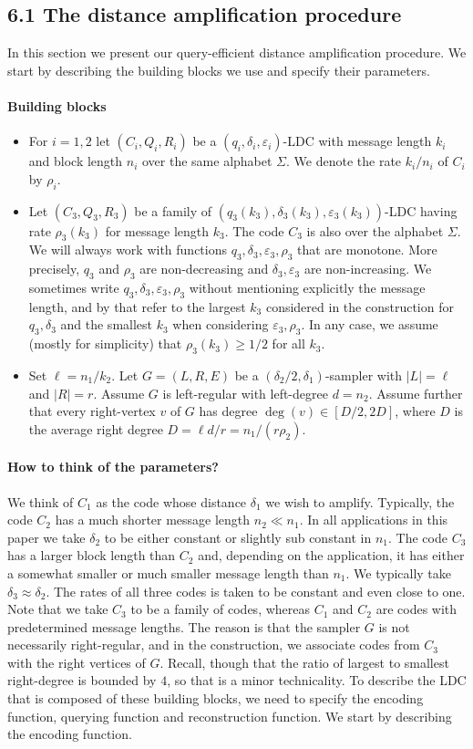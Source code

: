 \subsection*{6.1 The distance amplification procedure}
In this section we present our query-efficient distance amplification procedure. We start by describing the building blocks we use and specify their parameters.
\paragraph{Building blocks}
\begin{itemize}
\item For $i=1,2$ let $(C_i,Q_i,R_i)$ be a $(q_i,\delta_i,\varepsilon_i)$-LDC with message length $k_i$ and block length $n_i$ over the same alphabet $\Sigma$. We denote the rate $k_i/n_i$ of $C_i$ by $\rho_i$.
\item Let $(C_3,Q_3,R_3)$ be a family of $(q_3(k_3),\delta_3(k_3),\varepsilon_3(k_3))$-LDC having rate $\rho_3(k_3)$ for message length $k_3$. The code $C_3$ is also over the alphabet $\Sigma$. We will always work with functions $q_3,\delta_3,\varepsilon_3,\rho_3$ that are monotone. More precisely, $q_3$ and $\rho_3$ are non-decreasing and $\delta_3,\varepsilon_3$ are non-increasing. We sometimes write $q_3,\delta_3,\varepsilon_3,\rho_3$ without mentioning explicitly the message length, and by that refer to the largest $k_3$ considered in the construction for $q_3,\delta_3$ and the smallest $k_3$ when considering $\varepsilon_3,\rho_3$. In any case, we assume (mostly for simplicity) that $\rho_3(k_3)\geq1/2$ for all $k_3$.
\item Set $\ell=n_1/k_2$. Let $G=(L,R,E)$ be a $(\delta_2/2,\delta_1)$-sampler with $|L|=\ell$ and $|R|=r$. Assume $G$ is left-regular with left-degree $d=n_2$. Assume further that every right-vertex $v$ of $G$ has degree $\deg(v)\in[D/2,2D]$, where $D$ is the average right degree $D=\ell d/r=n_1/(r\rho_2)$.
\end{itemize}
\paragraph{How to think of the parameters?}
We think of $C_1$ as the code whose distance $\delta_1$ we wish to amplify. Typically, the code $C_2$ has a much shorter message length $n_2\ll n_1$. In all applications in this paper we take $\delta_2$ to be either constant or slightly sub constant in $n_1$. The code $C_3$ has a larger block length than $C_2$ and, depending on the application, it has either a somewhat smaller or much smaller message length than $n_1$. We typically take $\delta_3\approx\delta_2$. The rates of all three codes is taken to be constant and even close to one. Note that we take $C_3$ to be a family of codes, whereas $C_1$ and $C_2$ are codes with predetermined message lengths. The reason is that the sampler $G$ is not necessarily right-regular, and in the construction, we associate codes from $C_3$ with the right vertices of $G$. Recall, though that the ratio of largest to smallest right-degree is bounded by $4$, so that is a minor technicality.
To describe the LDC that is composed of these building blocks, we need to specify the encoding function, querying function and reconstruction function. We start by describing the encoding function.
